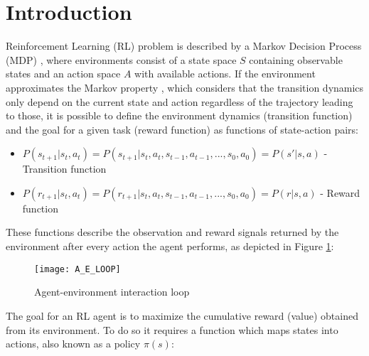 \documentclass[journal]{IEEEtran}
\begin{document}
\section{Introduction}
% 
% 
% 
% 
 Reinforcement Learning (RL) problem is described by a Markov Decision Process (MDP) \cite{Eugene_A._Feinberg-MDP}, where environments consist of a state space $S$ containing observable states and an action space $A$ with available actions. If the environment approximates the Markov property \cite{Sutton-RL}, which considers that the transition dynamics only depend on the current state and action regardless of the trajectory leading to those, it is possible to define the environment dynamics (transition function) and the goal for a given task (reward function) as functions of state-action pairs:

	\begin{itemize}
		 
		 \item $P(s_{t+1}|s_t,a_t) = P(s_{t+1}|s_t,a_t,s_{t-1},a_{t-1},...,s_0,a_0) = P(s'|s,a)$ - Transition function
		 	
		 \item $P(r_{t+1}|s_t,a_t) = P(r_{t+1}|s_t,a_t,s_{t-1},a_{t-1},...,s_0,a_0) = P(r|s,a)$ - Reward function
		 	
	\end{itemize}
	
	These functions describe the observation and reward signals returned by the environment after every action the agent performs, as depicted in Figure \ref{fig:LOOP}:
	
	\begin{figure}[ht]
		\hfill\texttt{[image: A\_E\_LOOP]}\hspace*{\fill}
		\caption{Agent-environment interaction loop}
		\label{fig:LOOP}
	\end{figure}
	
	The goal for an RL agent is to maximize the cumulative reward (value) obtained from its environment. To do so it requires a function which maps states into actions, also known as a policy $\pi(s)$:
	
\end{document}

